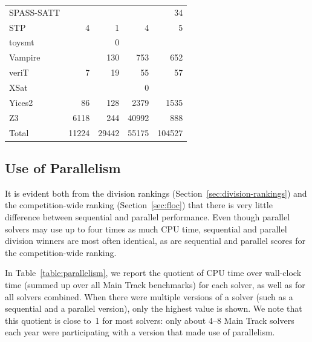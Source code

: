 \documentclass[dvipsnames,table,twoside,11pt]{article}
\newcommand{\maintrack}{Main Track\xspace}
\begin{document}
\begin{table}
\begin{tabular}{lrrrr}
    SPASS-SATT        &       &       &       & 34     \\
    STP               & 4     & 1     & 4     & 5      \\
    toysmt            &       & 0     &       &        \\
    Vampire           &       & 130   & 753   & 652    \\
    veriT             & 7     & 19    & 55    & 57     \\
    XSat              &       &       & 0     &        \\
    Yices2            & 86    & 128   & 2379  & 1535   \\
    Z3                & 6118  & 244   & 40992 & 888    \\
    \midrule
    Total             & 11224 & 29442 & 55175 & 104527 \\
    \bottomrule
  \end{tabular}
\end{table}

\subsection{Use of Parallelism}

It is evident both from the division rankings
(Section~\ref{sec:division-rankings}) and the competition-wide ranking
(Section~\ref{sec:floc}) that there is very little difference between
sequential and parallel performance.  Even though parallel solvers may
use up to four times as much CPU time, sequential and parallel
division winners are most often identical, as are sequential and
parallel scores for the competition-wide ranking.


In Table~\ref{table:parallelism}, we report the quotient of CPU time
over wall-clock time (summed up over all \maintrack benchmarks) for
each solver, as well as for all solvers combined.  When there were
multiple versions of a solver (such as a sequential and a parallel
version), only the highest value is shown.  We note that this quotient
is close to~1 for most solvers: only about 4--8 \maintrack solvers
each year were participating with a version that made use of
parallelism.
\end{document}
